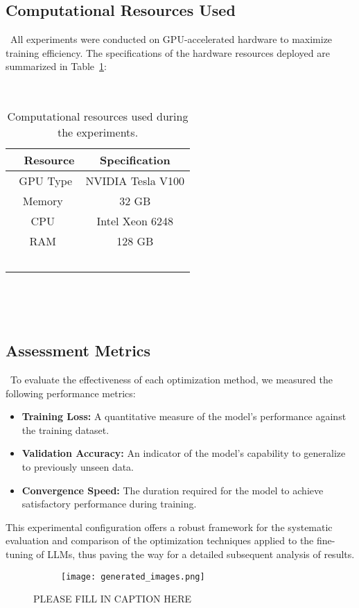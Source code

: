 \documentclass{article} %
\begin{document}
\subsection{Computational Resources Used}\
\noindent All experiments were conducted on GPU-accelerated hardware to maximize training efficiency. The specifications of the hardware resources deployed are summarized in Table~\ref{tab:resources}:
\begin{table}[h]\
  \centering\
  \begin{tabular}{|c|c|}\
    \hline\
    \textbf{Resource} & \textbf{Specification} \\
    \hline\
    GPU Type & NVIDIA Tesla V100 \\
    Memory & 32 GB \\
    CPU & Intel Xeon 6248  \\
    RAM & 128 GB  \\
    \hline\
  \end{tabular}\
  \caption{Computational resources used during the experiments.}\
  \label{tab:resources}\
\end{table}

\subsection{Assessment Metrics}\
\noindent To evaluate the effectiveness of each optimization method, we measured the following performance metrics:
\begin{itemize}
    \item \textbf{Training Loss:} A quantitative measure of the model's performance against the training dataset.
    \item \textbf{Validation Accuracy:} An indicator of the model's capability to generalize to previously unseen data.
    \item \textbf{Convergence Speed:} The duration required for the model to achieve satisfactory performance during training.
\end{itemize}

\noindent This experimental configuration offers a robust framework for the systematic evaluation and comparison of the optimization techniques applied to the fine-tuning of LLMs, thus paving the way for a detailed subsequent analysis of results.

\begin{figure}[t]
    \centering
    \begin{subfigure}{0.9\textwidth}
        \texttt{[image: generated\_images.png]}
        \label{fig:diffusion-samples}
    \end{subfigure}
    \caption{PLEASE FILL IN CAPTION HERE}
    \label{fig:first_figure}
\end{figure}
\end{document}
